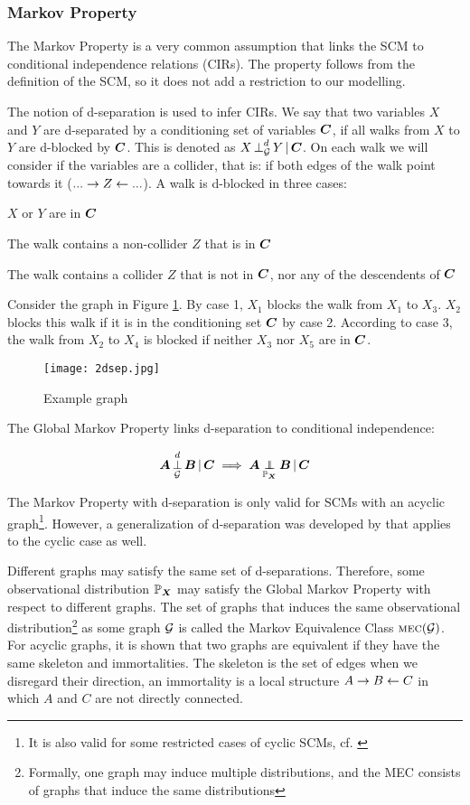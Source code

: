 \subsubsection{Markov Property}
The Markov Property is a very common assumption that links the SCM to conditional independence relations (CIRs). The property follows from the definition of the SCM, so it does not add a restriction to our modelling. 

The notion of d-separation is used to infer CIRs. We say that two variables $X$ and $Y$ are d-separated by a conditioning set of variables $\B{C}$, if all walks from $X$ to $Y$ are d-blocked by $\B{C}$. This is denoted as $\dsep{X}{Y}{\B{C}}{\C{G}}$. On each walk we will consider if the variables are a collider, that is: if both edges of the walk point towards it ($...\to Z \ot ...$). A walk is d-blocked in three cases:

\begin{compactenum}
    \item $X$ or $Y$ are in $\B{C}$
    \item The walk contains a non-collider $Z$ that is in $\B{C}$
    \item The walk contains a collider $Z$ that is not in $\B{C}$, nor any of the descendents of $\B{C}$
\end{compactenum}

Consider the graph in Figure \ref{fig:2:dsep}. By case 1, $X_1$ blocks the walk from $X_1$ to $X_3$. $X_2$ blocks this walk if it is in the conditioning set $\B{C}$ by case 2. According to case 3, the walk from $X_2$ to $X_4$ is blocked if neither $X_3$ nor $X_5$ are in $\B{C}$.

\begin{figure}[h]
    \centering
    \texttt{[image: 2dsep.jpg]}
    \caption{Example graph}
    \label{fig:2:dsep}
\end{figure}

The Global Markov Property links d-separation to conditional independence:

$$\dsep{\B{A}}{\B{B}}{\B{C}}{\C{G}} \implies \indep{\B{A}}{\B{B}}{\B{C}}{\Prb_{\B{X}}}$$

The Markov Property with d-separation is only valid for SCMs with an acyclic graph\footnote{It is also valid for some restricted cases of cyclic SCMs, cf. \citet{forre2017markov}}. However, a generalization of d-separation was developed by \citet{forre2017markov} that applies to the cyclic case as well.

Different graphs may satisfy the same set of d-separations. Therefore, some observational distribution $\Prb_{\B{X}}$ may satisfy the Global Markov Property with respect to different graphs. The set of graphs that induces the same observational distribution\footnote{Formally, one graph may induce multiple distributions, and the MEC consists of graphs that induce the same distributions} as some graph $\C{G}$ is called the Markov Equivalence Class $\mec(\C{G})$. For acyclic graphs, it is shown that two graphs are equivalent if they have the same skeleton and immortalities. The skeleton is the set of edges when we disregard their direction, an immortality is a local structure $A\to B \ot C$ in which $A$ and $C$ are not directly connected.

